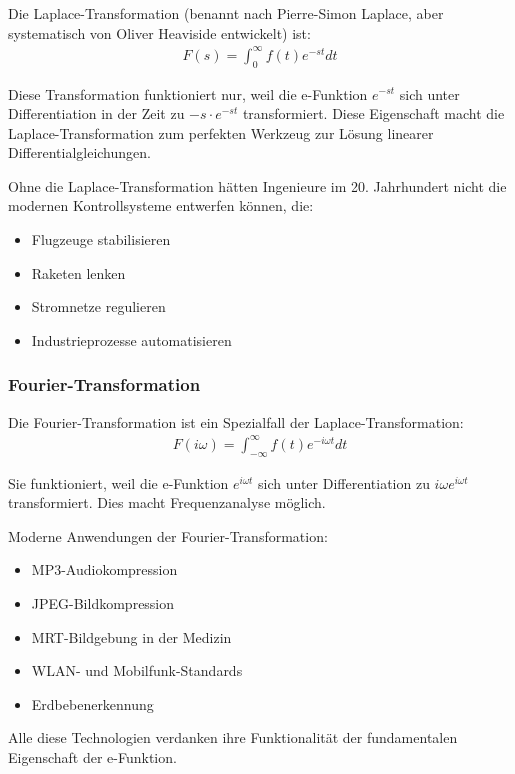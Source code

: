 \documentclass[a4paper, 12pt, twoside, openright]{report}
\theoremstyle{definition}
\theoremstyle{definition}
\begin{document}
Die Laplace-Transformation (benannt nach Pierre-Simon Laplace, aber systematisch von Oliver Heaviside entwickelt) ist:
\begin{align}
	F(s) = \int_0^{\infty} f(t) e^{-st} dt
\end{align}

Diese Transformation funktioniert nur, weil die e-Funktion $e^{-st}$ sich unter Differentiation in der Zeit zu $-s \cdot e^{-st}$ transformiert. Diese Eigenschaft macht die Laplace-Transformation zum perfekten Werkzeug zur Lösung linearer Differentialgleichungen.

Ohne die Laplace-Transformation hätten Ingenieure im 20. Jahrhundert nicht die modernen Kontrollsysteme entwerfen können, die:
\begin{itemize}
	\item[-] Flugzeuge stabilisieren
	\item[-] Raketen lenken
	\item[-] Stromnetze regulieren
	\item[-] Industrieprozesse automatisieren
\end{itemize}

\subsubsection*{Fourier-Transformation}

Die Fourier-Transformation ist ein Spezialfall der Laplace-Transformation:
\begin{align}
	F(i\omega) = \int_{-\infty}^{\infty} f(t) e^{-i\omega t} dt
\end{align}

Sie funktioniert, weil die e-Funktion $e^{i\omega t}$ sich unter Differentiation zu $i\omega e^{i\omega t}$ transformiert. Dies macht Frequenzanalyse möglich.

Moderne Anwendungen der Fourier-Transformation:
\begin{itemize}
	\item[-] MP3-Audiokompression
	\item[-] JPEG-Bildkompression
	\item[-] MRT-Bildgebung in der Medizin
	\item[-] WLAN- und Mobilfunk-Standards
	\item[-] Erdbebenerkennung
\end{itemize}

Alle diese Technologien verdanken ihre Funktionalität der fundamentalen Eigenschaft der e-Funktion.
\end{document}
